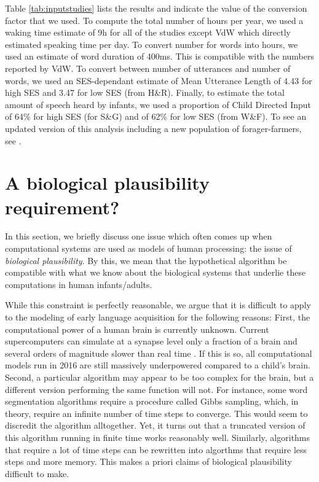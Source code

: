 \documentclass[jou,apacite]{apa6}
\begin{document}
Table \ref{tab:inputstudies} lists the results and indicate the value of the conversion factor that we used.  To compute the total number of hours per year, we used a waking time estimate of 9h for all of the studies except VdW which directly estimated  speaking time per day. To convert number for words into hours, we used an estimate of word duration of 400ms. This is compatible with the numbers reported by VdW. To convert between number of utterances and number of words, we used an SES-dependant estimate of Mean Utterance Length of 4.43 for high SES and 3.47 for low SES (from H\&R). Finally, to estimate the total amount of speech heard by infants, we used a proportion of Child Directed Input of 64\% for high SES (for S\&G) and of 62\% for low SES (from W\&F). To see an updated version of this analysis including a new population of forager-farmers, see \cite{cristia:2017}.


\section{A biological plausibility requirement?}\label{section:bioplaus}

In this section, we briefly discuss one issue which often comes up when computational systems are used as models of human processing: the issue of \emph{biological plausibility}. By this, we mean that the hypothetical algorithm be compatible with what we know about the biological systems that underlie these computations in human infants/adults. 

While this constraint is perfectly reasonable, we argue that it is difficult to apply to the modeling of early language acquisition for the following reasons: First, the computational power of a human brain is currently unknown. Current supercomputers can simulate at a synapse level only a fraction of a brain and several orders of magnitude slower than real time \cite{kunkel_2014}. If this is so, all computational models run in 2016 are still massively underpowered compared to a child's brain.  Second, a particular algorithm may appear to be too complex for the brain, but a different version performing the same function will not.  For instance, some word segmentation algorithms require a procedure called Gibbs sampling, which, in theory, require an infinite number of time steps to converge. This would seem to discredit the algorithm alltogether. Yet, it turns out that a truncated version of this algorithm running in finite time works reasonably well. Similarly, algorithms that require a lot of time steps can be rewritten into algorthms that require less steps and more memory. This makes a priori claims of biological plausibility difficult to make. 
\end{document}
